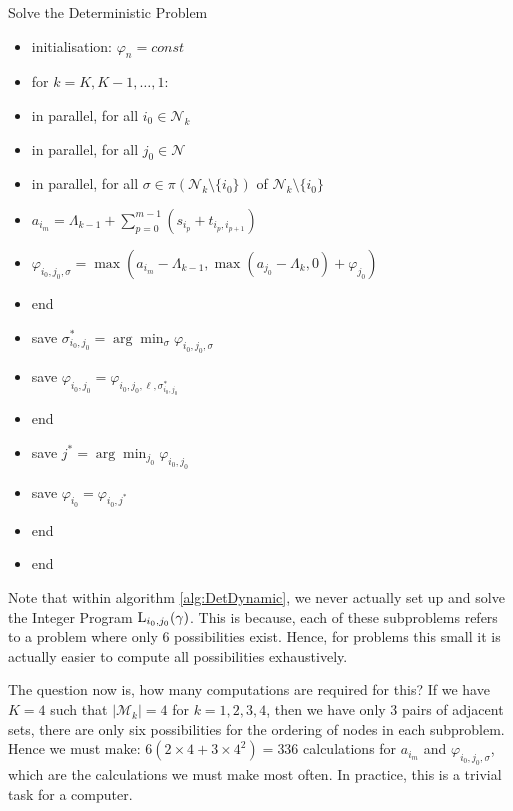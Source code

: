 \begin{algorithm}{Solve the Deterministic Problem}{}
	\label{alg:DetDynamic}
	\begin{itemize}
		\item[] initialisation: $\varphi_n = const$
		\item[] for $k=K, K-1, \ldots, 1:$
		\item[] \quad in parallel, for all $i_0\in{\mathcal N}_k$
		\item[] \quad\quad in parallel, for all $j_0\in{\mathcal N}$
		\item[] \quad\quad\quad in parallel, for all $\sigma\in\pi(\mathcal{N}_k \setminus\{i_0\})$ of ${\mathcal N}_k\setminus\{i_0\}$
		\item[] \quad\quad\quad\quad $a_{i_m}=\Lambda_{k-1}+\sum_{p=0}^{m-1}\left(s_{i_p}+t_{i_{p},i_{p+1}}\right)$
		\item[] \quad\quad\quad\quad $\varphi_{i_0,j_0,\sigma}=\max(a_{i_m}-\Lambda_{k-1}, \max(a_{j_0} - \Lambda_k,0) + \varphi_{j_0})$
		\item[] \quad\quad\quad end
		\item[] \quad\quad\quad save $\sigma^*_{i_0,j_0}=\arg\min_{\sigma}\varphi_{i_0,j_0,\sigma}$
		\item[] \quad\quad\quad save $\varphi_{i_0,j_0}=\varphi_{i_0,j_0,\ell,\sigma^*_{i_0,j_0}}$
		\item[] \quad\quad end
		\item[] \quad save $j^* = \arg\min_{j_0} \varphi_{i_0,j_0}$
		\item[] \quad save $\varphi_{i_0} = \varphi_{i_0, j^*}$
		\item[] \quad end
		\item[] end
	\end{itemize}
\end{algorithm}

Note that within algorithm \ref{alg:DetDynamic}, we never actually set up and solve the Integer Program $\operatorname{L}_{i_0,j_0}(\gamma)$. This is because, each of these subproblems refers to a problem where only 6 possibilities exist. Hence, for problems this small it is actually easier to compute all possibilities exhaustively. 

The question now is, how many computations are required for this? If we have $K = 4$ such that $|\mathcal{M}_k| = 4$ for $k = 1, 2, 3, 4$, then we have only 3 pairs of adjacent sets, there are only six possibilities for the ordering of nodes in each subproblem. Hence we must make: $6( 2\times 4 + 3\times4^2 ) = 336$ calculations for $a_{i_m}$ and $\varphi_{i_0, j_0, \sigma}$, which are the calculations we must make most often. In practice, this is a trivial task for a computer.



